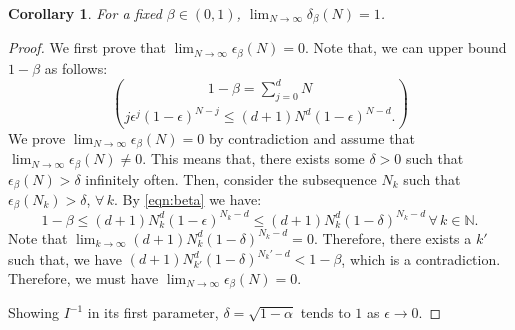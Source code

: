 \documentclass[letterpaper, 10 pt, conference]{ieeeconf}  %
\newcommand{\N}{\mathbb{N} }
\newtheorem{corollary}[theorem]{Corollary}
\begin{document}
\begin{corollary}For a fixed $\beta \in (0,1)$, $\lim_{N \to \infty} \delta_\beta(N) = 1$.
\end{corollary}

\begin{proof} 
We first prove that $\lim_{N \to \infty} \epsilon_\beta(N) = 0$. Note that, we can upper bound $1-\beta$ as follows:
\begin{equation}\label{eqn:beta}1-\beta = \sum_{j=0}^d {N}\choose{j} \epsilon^j (1-\epsilon)^{N-j} \leq  (d+1)N^d (1-\epsilon)^{N-d}.
\end{equation}
We prove $\lim_{N \to \infty} \epsilon_\beta(N) = 0$ by contradiction and assume that $\lim_{N \to \infty} \epsilon_\beta(N) \not= 0$. This means that, there exists some $\delta > 0$ such that $\epsilon_\beta(N) > \delta$ infinitely often. Then, consider the subsequence $N_k$ such that $\epsilon_\beta(N_k) > \delta$, $\forall\, k.$ By \eqref{eqn:beta} we have:
\begin{equation*}1-\beta \leq (d+1)N_k^d (1-\epsilon)^{N_k-d} \leq (d+1)N_k^d (1-\delta)^{N_k-d}\, \forall\,k \in \N. 
\end{equation*}
Note that $\lim_{k \to \infty}(d+1)N_k^d (1-\delta)^{N_k-d} = 0.$ Therefore, there exists a $k'$ such that, we have $ (d+1)N_{k'}^d (1-\delta)^{N_k'-d} < 1 -\beta$, which is a contradiction. Therefore, we must have  $\lim_{N \to \infty} \epsilon_\beta(N) = 0$.

Showing $I^{-1}$ in its first parameter, $\delta = \sqrt{1-\alpha}$ tends to $1$ as $\epsilon \to 0$.

\end{proof}
\end{document}
